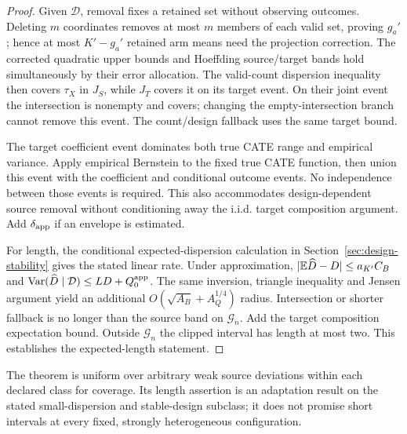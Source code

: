 \begin{proof}
Given $\mathcal D$, removal fixes a retained set without observing outcomes.
Deleting $m$ coordinates removes at most $m$ members of each valid set,
proving $g_a'$; hence at most $K'-g_a'$ retained arm means need the projection
correction. The corrected quadratic upper bounds and Hoeffding source/target
bands hold simultaneously by their error allocation. The valid-count
dispersion inequality then covers $\tau_X$ in $J_S$, while $J_T$ covers it
on its target event. On their joint event the intersection is nonempty and
covers; changing the empty-intersection branch cannot remove this event.
The count/design fallback uses the same target bound.

The target coefficient event dominates both true CATE range and empirical
variance. Apply empirical Bernstein to the fixed true CATE function, then
union this event with the coefficient and conditional outcome events. No
independence between those events is required. This also accommodates
design-dependent source removal without conditioning away the i.i.d. target
composition argument. Add $\delta_{\rm app}$ if an envelope is estimated.

For length, the conditional expected-dispersion calculation in
Section~\ref{sec:design-stability} gives the stated linear rate. Under
approximation, $|\mathbb E\widehat D-D|\le a_{K'}C_B$ and
$\operatorname{Var}(\widehat D\mid\mathcal D)\le LD+Q_0^{\rm app}$. The same inversion,
triangle inequality and Jensen argument yield an additional
$O(\sqrt{A_B}+A_Q^{1/4})$ radius. Intersection or shorter fallback is no
longer than the source band on $\mathcal G_n$. Add the target composition
expectation bound. Outside $\mathcal G_n$ the clipped interval has length
at most two. This establishes the expected-length statement.
\end{proof}

The theorem is uniform over arbitrary weak source deviations within each
declared class for coverage. Its length assertion is an adaptation result on
the stated small-dispersion and stable-design subclass; it does not promise
short intervals at every fixed, strongly heterogeneous configuration.
